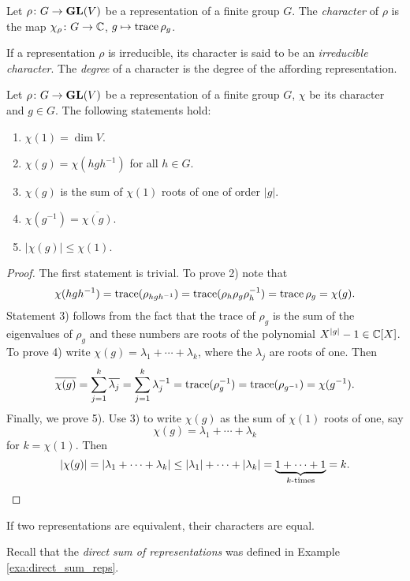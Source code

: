 \begin{definition}
	Let $\rho\colon G\to\mathbf{GL}(V)$ be a representation of a finite group $G$. The \emph{character} of $\rho$ 
	is the map $\chi_\rho\colon G\to\mathbb{C}$, $g\mapsto\operatorname{trace}\rho_g$. 	
\end{definition}

If a representation $\rho$ is irreducible, its character is said to be an 
\emph{irreducible character}. The \emph{degree} of a character is the degree of the affording
representation. 

\begin{proposition}
	Let $\rho\colon G\to\mathbf{GL}(V)$ be a representation of a finite group $G$, $\chi$ be its character and $g\in G$.
	The following statements hold:
	\begin{enumerate}
		\item $\chi(1)=\dim V$. 
		\item $\chi(g)=\chi(hgh^{-1})$ for all $h\in G$.
		\item $\chi(g)$ is the sum of $\chi(1)$ roots of one of order $|g|$. 
		\item $\chi(g^{-1})=\overline{\chi(g)}$. 
		\item $|\chi(g)|\leq\chi(1)$.  
	\end{enumerate} 
\end{proposition}

\begin{proof}
	The first statement is trivial. 	To prove 2) note that
	\[
	\chi(hgh^{-1})=\operatorname{trace}(\rho_{hgh^{-1}})=\operatorname{trace}(\rho_h\rho_g\rho_h^{-1})=\operatorname{trace}\rho_g=\chi(g).
	\]
	Statement 3) follows from the fact that the trace of $\rho_g$ is the sum
	of the eigenvalues of $\rho_g$ and these numbers are roots of the polynomial
	$X^{|g|}-1\in\mathbb{C}[X]$. To prove 4) write $\chi(g)=\lambda_1+\cdots+\lambda_k$, where 
	the $\lambda_j$ are roots of one. Then
	\[
	\overline{\chi(g)}=\sum^k_{j=1}\overline{\lambda_j}
	=\sum_{j=1}^k\lambda_j^{-1}
	=\operatorname{trace}(\rho_g^{-1})
	=\operatorname{trace}(\rho_{g^{-1}})
	=\chi(g^{-1}).
	\] 
	Finally, we prove 5). Use 3) to write $\chi(g)$ as the sum of
	$\chi(1)$ roots of one, say \[
 \chi(g)=\lambda_1+\cdots+\lambda_k
 \]
 for
	$k=\chi(1)$. Then 
	\[
	|\chi(g)|=|\lambda_1+\cdots+\lambda_k|\leq |\lambda_1|+\cdots+|\lambda_k|
	=\underbrace{1+\cdots+1}_{\text{$k$-times}}=k.\qedhere
	\]
\end{proof}

If two representations are equivalent, their characters are equal.

Recall that the \emph{direct sum of representations} was defined in Example \ref{exa:direct_sum_reps}.

